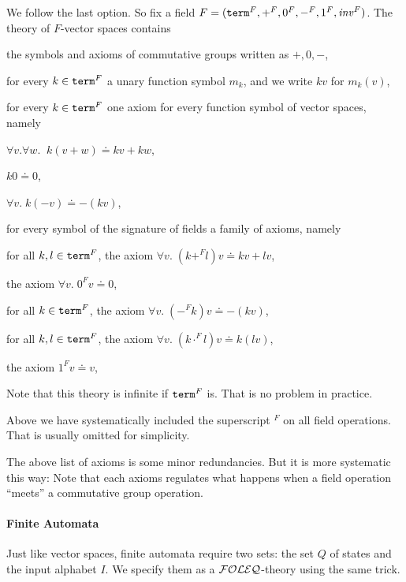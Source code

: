 We follow the last option.
So fix a field $F=(\mathtt{term}^F,+^F,0^F,-^F,1^F,\mathit{inv}^F)$.
The theory of $F$-vector spaces contains
\begin{compactitem}
  \item the symbols and axioms of commutative groups written as $+,0,-$,
  \item for every $k\in\mathtt{term}^F$ a unary function symbol $m_k$, and we write $kv$ for $m_k(v)$,
  \item for every $k\in\mathtt{term}^F$ one axiom for every function symbol of vector spaces, namely
     \begin{compactitem}
       \item $\forall v.\forall w.\;\;k(v+w)\doteq kv+kw$,
       \item $k0\doteq 0$,
       \item $\forall v.\;k(-v)\doteq -(kv)$,
     \end{compactitem}       
  \item for every symbol of the signature of fields a family of axioms, namely
     \begin{compactitem}
       \item for all $k,l\in\mathtt{term}^F$, the axiom $\forall v.\;(k+^F l)v\doteq kv+lv$,
       \item the axiom $\forall v.\;0^F v\doteq 0$,
       \item for all $k\in\mathtt{term}^F$, the axiom $\forall v.\;(-^F k)v\doteq -(kv)$,
       \item for all $k,l\in\mathtt{term}^F$, the axiom $\forall v.\;(k\cdot^F l)v\doteq k(lv)$,
       \item the axiom $1^F v\doteq v$,
     \end{compactitem}
\end{compactitem}

Note that this theory is infinite if $\mathtt{term}^F$ is.
That is no problem in practice.

Above we have systematically included the superscript $^F$ on all field operations.
That is usually omitted for simplicity.

The above list of axioms is some minor redundancies.
But it is more systematic this way: Note that each axioms regulates what happens when a field operation ``meets'' a commutative group operation.

\paragraph{Finite Automata}
Just like vector spaces, finite automata require two sets: the set $Q$ of states and the input alphabet $I$.
We specify them as a ${\mathcal{FOLEQ}}$-theory using the same trick.

